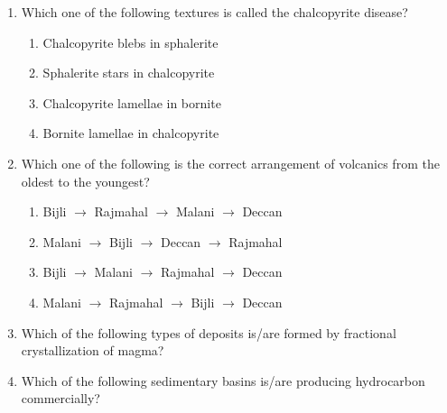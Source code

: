 \documentclass[journal,12pt,onecolumn]{IEEEtran}
\theoremstyle{remark}
\begin{document}
\begin{enumerate}
\item Which one of the following textures is called the chalcopyrite disease?
\begin{enumerate}
    \item Chalcopyrite blebs in sphalerite
    \item Sphalerite stars in chalcopyrite
    \item Chalcopyrite lamellae in bornite
    \item Bornite lamellae in chalcopyrite
\end{enumerate}
\hfill{}

\item Which one of the following is the correct arrangement of volcanics from the oldest to the youngest?
\begin{enumerate}
    \item Bijli $\rightarrow$ Rajmahal $\rightarrow$ Malani $\rightarrow$ Deccan
    \item Malani $\rightarrow$ Bijli $\rightarrow$ Deccan $\rightarrow$ Rajmahal
    \item Bijli $\rightarrow$ Malani $\rightarrow$ Rajmahal $\rightarrow$ Deccan
    \item Malani $\rightarrow$ Rajmahal $\rightarrow$ Bijli $\rightarrow$ Deccan
\end{enumerate}
\hfill{}

\item Which of the following types of deposits is/are formed by fractional crystallization of magma?
\begin{enumerate}
\end{enumerate}
\hfill{}

\item Which of the following sedimentary basins is/are producing hydrocarbon commercially?
\begin{enumerate}
\end{enumerate}
\hfill{}


\end{enumerate}
\end{document}
